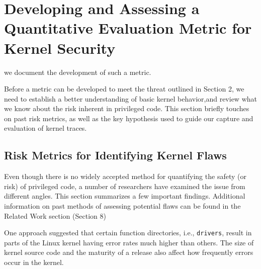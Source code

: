 \section{Developing and Assessing a Quantitative Evaluation Metric for Kernel Security}
\label{sec.metric}

we document the development of such a metric.


Before a metric can be developed to meet the threat outlined in Section 2, we need to
establish a better understanding of basic kernel behavior,and review what we know about
the risk inherent in privileged code. This section briefly touches on past risk
metrics, as well as the key hypothesis used to guide our capture and evaluation
of kernel traces.

\subsection{Risk Metrics for Identifying Kernel Flaws}

Even though there is no widely accepted method for
quantifying the safety (or risk) of privileged code, a number of researchers have
examined the issue from different angles. This section summarizes a few important
findings. Additional information on past methods
of assessing potential flaws can be found in the Related Work section (Section 8)


One approach \cite{PittSFIeld} suggested that certain function
directories, i.e., \texttt{drivers},
result in parts of the Linux kernel having error rates much higher than
others. The size of kernel source code and the maturity of a release also affect
how frequently errors occur in the kernel.

